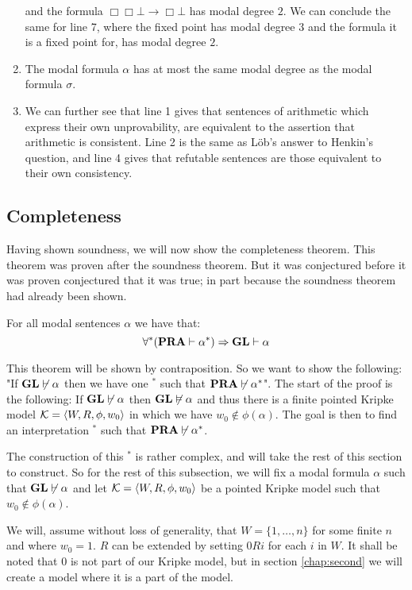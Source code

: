 \documentclass[../main.tex]{subfiles}
\begin{document}
\begin{enumerate}
		and the formula $\Box\Box\bot\rightarrow\Box\bot$ has modal degree
		$2$. We can conclude the same for line 7, where the fixed point
		has modal degree $3$ and the formula it is a fixed point for,
		has modal degree $2$.
	\item The modal formula $\alpha$ has at most the same modal degree as
		the modal formula $\sigma$.
	\item We can further see that line 1 gives that sentences of arithmetic
		which express their own unprovability, are equivalent to the
		assertion that arithmetic is consistent. Line 2 is the same as Löb's
		answer to Henkin's question, and line 4 gives that refutable
		sentences are those equivalent to their own consistency.
\end{enumerate}
\subsection{Completeness}
Having shown soundness, we will now show the completeness theorem. This theorem
was proven after the soundness theorem. But it was conjectured  before it was
proven conjectured that it was true; in part because the soundness theorem had
already been shown.

\begin{thm}
	For all modal sentences $\alpha$ we have that:
	\[\forall ^* (\text{\textbf{PRA}}\vdash \alpha^*)\Rightarrow \text{\textbf{GL}}\vdash \alpha\]
\end{thm}

This theorem will be shown by contraposition. So we want to show the following:
"If $\text{\textbf{GL}}\not\vdash \alpha$ then we
have one $^*$ such that $\text{\textbf{PRA}}\not\vdash\alpha^*$". 
The start of the proof is the following: If $\text{\textbf{GL}}\not\vdash\alpha$ then
$\text{\textbf{GL}}\not\vDash\alpha$ and thus there is a finite pointed Kripke model $\mathcal{K}=\langle
W,R,\phi,w_0\rangle$ in which we have $w_0\not\in\phi(\alpha)$. The goal is then to
find an interpretation $^*$ such that $\text{\textbf{PRA}}\not\vdash\alpha^*$.

The construction of this
$^*$ is rather complex, and will take the rest of this section to construct. So for the
rest of this subsection, we will fix a modal formula $\alpha$ such that $\text{\textbf{GL}}\not\vdash
\alpha$
and let $\mathcal{K}=\langle W,R,\phi,w_0\rangle$ be a pointed Kripke model such that
$w_0\not\in\phi(\alpha)$.

We will, assume without loss of generality,  
that $W=\{1,\ldots, n\}$ for some finite $n$ and where $w_0=1$.
$R$ can be extended by setting $0Ri$ for each $i$ in $W$. It shall be noted
that $0$ is not part of our Kripke model, but  in section
\ref{chap:second} we will create a model where it is a part of the model.
\end{document}
